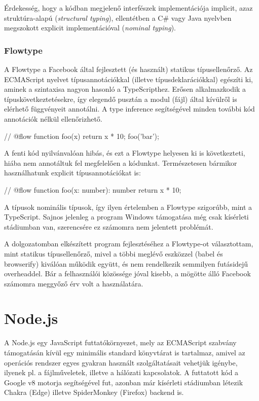 Érdekesség, hogy a kódban megjelenő interfészek implementációja
implicit, azaz struktúra-alapú (\emph{structural typing}), ellentétben a C\#
vagy Java nyelvben megszokott explicit implementációval (\emph{nominal typing}).

\subsubsection{Flowtype}

A Flowtype a Facebook által fejlesztett (és használt) statikus típusellenőrző.
Az ECMAScript nyelvet típusannotációkkal (illetve típusdeklarációkkal) egészíti
ki, aminek a szintaxisa nagyon hasonló a TypeScripthez.  Erősen alkalmazkodik a
típuskövetkeztetésekre, így elegendő pusztán a modul (fájl) által kívülről is
elérhető függvényeit annotálni.  A type inference segítségével minden további
kód annotációk nélkül ellenőrizhető.

\begin{js}
// @flow
function foo(x) {
  return x * 10;
}
foo('bar');
\end{js}

A fenti kód nyilvánvalóan hibás, és ezt a Flowtype helyesen ki is következteti,
hiába nem annotáltuk fel megfelelően a kódunkat. Természetesen bármikor
használhatunk explicit típusannotációkat is:

\begin{js}
// @flow
function foo(x: number): number {
  return x * 10;
}
\end{js}

A típusok nominális típusok, így ilyen értelemben a Flowtype szigorúbb, mint a
TypeScript.  Sajnos jelenleg a program Windows támogatása még csak kísérleti
stádiumban van, szerencsére ez számomra nem jelentett problémát.

A dolgozatomban elkészített program fejlesztéséhez a Flowtype-ot választottam,
mint statikus típusellenőrző, mivel a többi meglévő eszközzel (babel és
browserify) kiválóan működik együtt, és nem rendelkezik semmilyen futásidejű
overheaddel. Bár a felhasználói közössége jóval kisebb, a mögötte álló Facebook
számomra meggyőző érv volt a használatára.

\section{Node.js}

A Node.js egy JavaScript futtatókörnyezet, mely az ECMAScript szabvány
támogatásán kívül egy minimális standard könyvtárat is tartalmaz, amivel az
operációs rendszer egyes gyakran használt szolgáltatásait vehetjük igénybe,
ilyenek pl. a fájlműveletek, illetve a hálózati kapcsolatok.  A futtatott kód a
Google v8 motorja segítségével fut, azonban már kísérleti stádiumban létezik
Chakra (Edge) illetve SpiderMonkey (Firefox) backend is.

